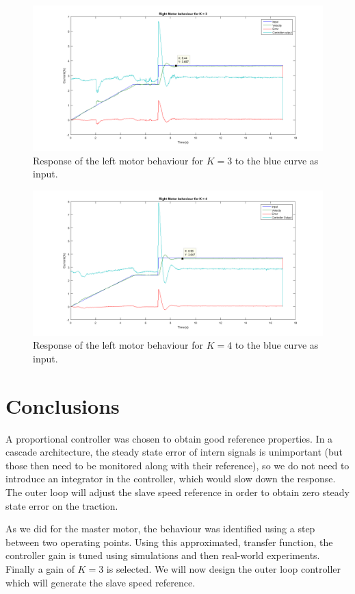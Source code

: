 \begin{figure}[htbp]
\centering
\includegraphics[width = \textwidth]{pics/RM_K3.png}
\caption{Response of the left motor behaviour for $K = 3$ to the blue curve as input.}
\label{fig:RM_K3}
\end{figure}

\begin{figure}[htbp]
\centering
\includegraphics[width = \textwidth]{pics/RM_K4.png}
\caption{Response of the left motor behaviour for $K = 4$ to the blue curve as input.}
\label{fig:RM_K4}
\end{figure}


\section{Conclusions}
A proportional controller was chosen to obtain good reference properties. In a cascade architecture, the steady state error of intern signals is unimportant (but those then need to be monitored along with their reference), so we do not need to introduce an integrator in the controller, which would slow down the response. The outer loop will adjust the slave speed reference in order to obtain zero steady state error on the traction.

As we did for the master motor, the behaviour was identified using a step between two operating points. Using this approximated, transfer function, the controller gain is tuned using simulations and then real-world experiments. Finally a gain of $K = 3$ is selected. We will now design the outer loop controller which will generate the slave speed reference.
